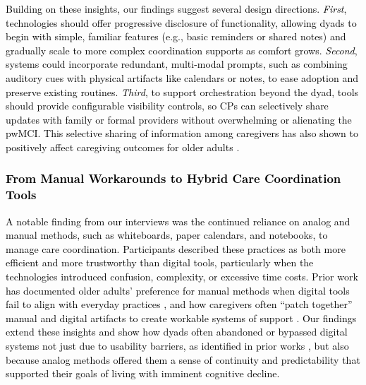 \documentclass[acmsmall]{acmart}
\begin{document}
\textcolor{black}{Building on these insights, our findings suggest several design directions. \textit{First}, technologies should offer progressive disclosure of functionality, allowing dyads to begin with simple, familiar features (e.g., basic reminders or shared notes) and gradually scale to more complex coordination supports as comfort grows. \textit{Second}, systems could incorporate redundant, multi-modal prompts, such as combining auditory cues with physical artifacts like calendars or notes, to ease adoption and preserve existing routines. \textit{Third}, to support orchestration beyond the dyad, tools should provide configurable visibility controls, so CPs can selectively share updates with family or formal providers without overwhelming or alienating the pwMCI. This selective sharing of information among caregivers has also shown to positively affect caregiving outcomes for older adults \cite{crotty2015information}.} 

\textcolor{black}{\subsubsection{From Manual Workarounds to Hybrid Care Coordination Tools}
A notable finding from our interviews was the continued reliance on analog and manual methods, such as whiteboards, paper calendars, and notebooks, to manage care coordination. Participants described these practices as both more efficient and more trustworthy than digital tools, particularly when the technologies introduced confusion, complexity, or excessive time costs. Prior work has documented older adults’ preference for manual methods when digital tools fail to align with everyday practices \cite{dai2025envisioning, chan2025insights}, and how caregivers often “patch together” manual and digital artifacts to create workable systems of support \cite{renyi2022uncovering, yamashita2019associations}. Our findings extend these insights and show how dyads often abandoned or bypassed digital systems not just due to usability barriers, as identified in prior works \cite{knowles2018wisdom, lee2024effects}, but also because analog methods offered them a sense of continuity and predictability that supported their goals of living with imminent cognitive decline.} 
\end{document}
